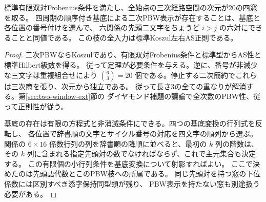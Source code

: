 \begin{corollary}
標準有限双対Frobenius条件を満たし、全始点の三次経路空間の次元が20の四窓を取る。
四周期の順序付き基底による二次PBW表示が存在することは、基底と各位置の番号付けを選んで、
六関係の先頭二文字をちょうど $i>j$ の六対にできることと同値である。
この枝の全入力は標準Koszul左右AS正則である。
\end{corollary}
\begin{proof}
二次PBWならKoszulであり、有限双対Frobenius条件と標準型からAS性と標準Hilbert級数を得る。
従って定理が必要条件を与える。逆に、番号が非減少な三文字は重複組合せにより
$\binom{6}{3}=20$ 個である。停止する二次簡約でこれらは三次商を張り、次元から独立である。
従って長さ3の全ての重なりが解消する。第\ref{sec:two-window-ext}節の
ダイヤモンド補題の議論で全次数のPBW性、従って正則性が従う。

基底の存在は有限の方程式と非消滅条件にできる。四つの基底変換の行列式を反転し、
各位置で辞書順の文字とサイクル番号の対応を四文字の順列から選ぶ。
関係の $6\times16$ 係数行列の列を辞書順の降順に並べると、最初の $k$ 列の階数は、
その $k$ 列に含まれる指定先頭対の数でなければならず、これで主元集合も決定する。
この有限個の小行列条件を基底変換について射影すればよい。
ここで決めたのは先頭語代数とこのPBW枝への所属である。
同じ先頭対を持つ窓の下位係数には区別すべき添字保持同型類が残り、
PBW表示を持たない窓も別途扱う必要がある。
\end{proof}

